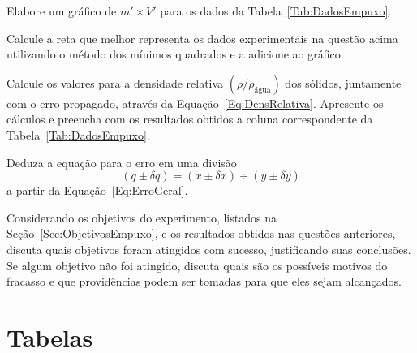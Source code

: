 \begin{question}[type={exam}]{1}
Elabore um gráfico de $m' \times V'$ para os dados da Tabela~\ref{Tab:DadosEmpuxo}.
\end{question}

\begin{question}[type={exam}]{1.5}
Calcule a reta que melhor representa os dados experimentais na questão acima utilizando o método dos mínimos quadrados e a adicione ao gráfico.
\end{question}

\begin{question}[type={exam}]{1.5}
Calcule os valores para a densidade relativa $(\rho/\rho_{\textrm{água}})$ dos sólidos, juntamente com o erro propagado, através da Equação~\ref{Eq:DensRelativa}. Apresente os cálculos e preencha com os resultados obtidos a coluna correspondente da Tabela~\ref{Tab:DadosEmpuxo}. 
\end{question}

\begin{question}[type={exam}]{1.5}
Deduza a equação para o erro em uma divisão
\begin{equation}
    (q \pm \delta q) = (x \pm \delta x) \div (y \pm \delta y)
\end{equation}
%
a partir da Equação~\eqref{Eq:ErroGeral}.
\end{question}

\begin{question}[type={exam}]{1.5}
Considerando os objetivos do experimento, listados na Seção~\ref{Sec:ObjetivosEmpuxo}, e os resultados obtidos nas questões anteriores, discuta quais objetivos foram atingidos com sucesso, justificando suas conclusões. Se algum objetivo não foi atingido, discuta quais são os possíveis motivos do fracasso e que providências podem ser tomadas para que eles sejam alcançados.
\end{question}

\vfill
\pagebreak
\section{Tabelas}

